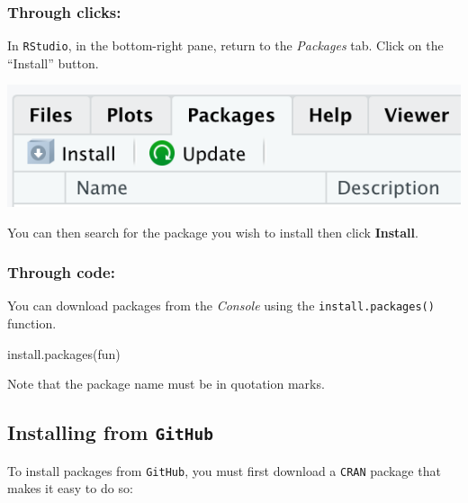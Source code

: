 \documentclass[
]{book}
\newenvironment{Shaded}{\begin{snugshade}}{\end{snugshade}}
\newcommand{\FunctionTok}[1]{\textcolor[rgb]{0.00,0.00,0.00}{#1}}
\newcommand{\NormalTok}[1]{#1}
\newcommand{\StringTok}[1]{\textcolor[rgb]{0.31,0.60,0.02}{#1}}
\begin{document}
\hypertarget{through-clicks}{%
\subsubsection*{Through clicks:}\label{through-clicks}}

In \texttt{RStudio}, in the bottom-right pane, return to the \emph{Packages} tab. Click on the ``Install'' button.

\includegraphics{img/rstudio_install-package.png}

You can then search for the package you wish to install then click \textbf{Install}.

\hypertarget{through-code}{%
\subsubsection*{Through code:}\label{through-code}}

You can download packages from the \emph{Console} using the \texttt{install.packages()} function.

\begin{Shaded}
\begin{Highlighting}[]
\FunctionTok{install.packages}\NormalTok{(}\StringTok{\textquotesingle{}fun\textquotesingle{}}\NormalTok{)}
\end{Highlighting}
\end{Shaded}

Note that the package name must be in quotation marks.

\hypertarget{installing-from-github}{%
\subsection*{\texorpdfstring{Installing from \texttt{GitHub}}{Installing from GitHub}}\label{installing-from-github}}

To install packages from \texttt{GitHub}, you must first download a \texttt{CRAN} package that makes it easy to do so:
\end{document}
